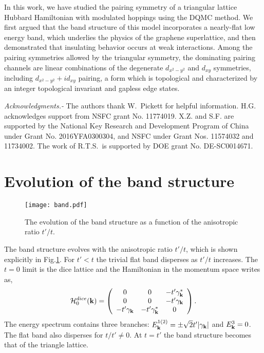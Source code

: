 \documentclass[%
 reprint,
 amsmath,amssymb,
 aps,
]{revtex4-1}
\begin{document}
In this work,
we have studied the pairing symmetry of a triangular
lattice Hubbard Hamiltonian with modulated hoppings
using the DQMC method.  We first argued
that the band structure of this model incorporates a nearly-flat low
energy band, which underlies the physics of the graphene superlattice,
and then demonstrated that insulating behavior occurs at weak
interactions. Among the pairing symmetries allowed by the triangular
symmetry, the dominating pairing channels are linear combinations of the
degenerate $d_{x^2-y^2}$ and $d_{xy}$ symmetries, including $d_{x^2-y^2}
+ i d_{xy}$ pairing, a form which is topological and characterized by an
integer topological invariant and gapless edge states.

\textit{Acknowledgments.-}
The authors thank W.~Pickett for helpful information. H.G. acknowledges support from NSFC grant No. 11774019. X.Z. and S.F. are supported by the National Key Research and Development Program of China under Grant No. 2016YFA0300304, and NSFC under Grant Nos. 11574032 and 11734002. The work of R.T.S.~is supported by DOE grant No. DE-SC0014671.


\appendix
\section{Evolution of the band structure}

\begin{figure}[htbp]
\centering \texttt{[image: band.pdf]} \caption{The evolution of the band structure as a function of the anisotropic ratio $t'/t$.}
\label{fig7}
\end{figure}

The band structure evolves with the anisotropic ratio $t'/t$, which is shown explicitly in Fig.\ref{fig7}. For $t'<t$ the trivial flat band disperses as $t'/t$ increases. The $t=0$ limit is the dice lattice and the Hamiltonian in the momentum space writes as,
\begin{equation}\label{eqa}
{\cal H}_{0}^{dice}({\bf k})=\left(
                    \begin{array}{ccc}
                      0 & 0 & -t'\gamma^*_{\bf k} \\
                      0 & 0 & -t'\gamma_{\bf k} \\
                      -t'\gamma_{\bf k} & -t'\gamma^*_{\bf k} & 0 \\
                    \end{array}
                  \right).
\end{equation}
The energy spectrum contains three branches: $E_{\bf k}^{1(2)}=\pm\sqrt{2}t'|\gamma_{\bf k}|$ and $E_{\bf k}^{3}=0$. The flat band also disperses for $t/t'\neq 0$. At $t=t'$ the band structure becomes that of the triangle lattice.
\end{document}

